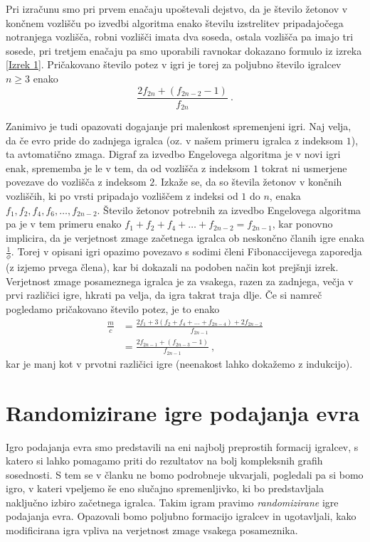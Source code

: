 \documentclass[twoside,11pt]{article}
\begin{document}
Pri izračunu smo pri prvem enačaju upoštevali dejstvo, da je število žetonov v končnem vozlišču po izvedbi algoritma enako številu izstrelitev pripadajočega notranjega vozlišča, robni vozlišči imata dva soseda, ostala vozlišča pa imajo tri sosede, pri tretjem enačaju pa smo uporabili ravnokar dokazano formulo iz izreka \ref{Izrek 1}.
Pričakovano število potez v igri je torej za poljubno število igralcev $n\ge3$ enako 
$$
\frac{2f_{2n} + (f_{2n-2}-1)}{f_{2n}} \ .
$$

Zanimivo je tudi opazovati dogajanje pri malenkost spremenjeni igri. Naj velja, da če evro pride 
do zadnjega igralca (oz.\,\,v našem primeru igralca z indeksom $1$), ta avtomatično zmaga. Digraf za izvedbo Engelovega algoritma je v novi igri enak, 
sprememba je le v tem, da od vozlišča z indeksom $1$ tokrat ni usmerjene povezave do vozlišča z indeksom $2$. 
Izkaže se, da so števila žetonov v končnih vozliščih, ki po vrsti pripadajo vozliščem z indeksi od $1$ 
do $n$, enaka $f_1,f_2,f_4,f_6,\ldots,f_{2n-2}$.
Število žetonov potrebnih za izvedbo Engelovega algoritma pa je v tem primeru enako $f_1+f_2+f_4+\ldots+f_{2n-2}=f_{2n-1}$, 
kar ponovno implicira, da je verjetnost zmage začetnega igralca ob neskončno članih igre enaka $\frac{1}{\phi}$. 
Torej v opisani igri opazimo povezavo s sodimi členi Fibonaccijevega zaporedja (z izjemo prvega člena), 
kar bi dokazali na podoben način kot prejšnji izrek.
Verjetnost zmage posameznega igralca je za vsakega, razen za zadnjega, večja v prvi različici igre, hkrati pa velja, da igra takrat traja dlje.
Če si namreč pogledamo pričakovano število potez, je to enako
\begin{align*}
    \frac{m}{c} &= \frac{2f_1 + 3(f_2+f_4+\ldots+f_{2n-4})+ 2f_{2n-2}}{f_{2n-1}} \\
    &= \frac{2f_{2n-1} + (f_{2n-3}-1)}{f_{2n-1}} \ ,
\end{align*}
kar je manj kot v prvotni različici igre (neenakost lahko dokažemo z indukcijo).

\section{Randomizirane igre podajanja evra}
Igro podajanja evra smo predstavili na eni najbolj preprostih formacij igralcev, s katero si lahko pomagamo priti do rezultatov na bolj kompleksnih grafih sosednosti. 
S tem se v članku ne bomo podrobneje ukvarjali, pogledali pa si bomo igro, v kateri vpeljemo še eno slučajno spremenljivko, ki bo predstavljala naključno izbiro začetnega igralca. Takim
igram pravimo \emph{randomizirane} igre podajanja evra. Opazovali bomo poljubno formacijo igralcev in ugotavljali, kako modificirana igra vpliva na verjetnost zmage vsakega posameznika. 
\end{document}
